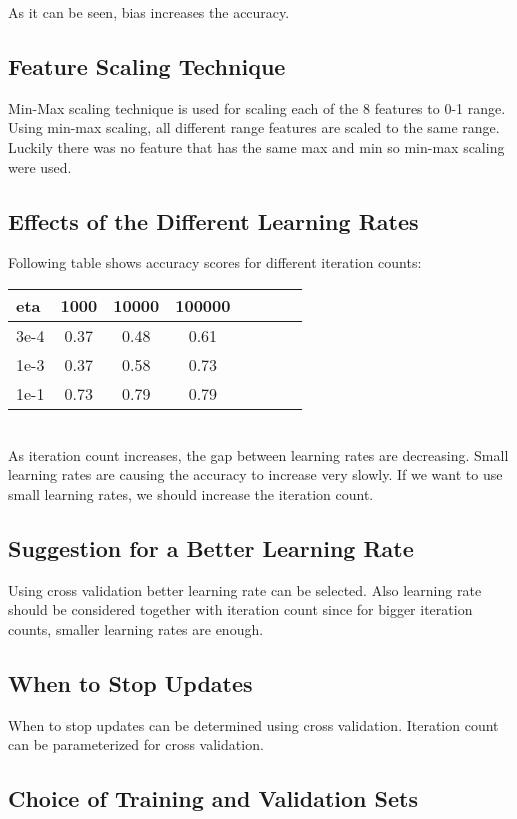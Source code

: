 \documentclass[conference]{IEEEtran}
\begin{document}
As it can be seen, bias increases the accuracy.

\subsection{Feature Scaling Technique}

Min-Max scaling technique is used for scaling each of the 8 features to 0-1 range. Using min-max scaling, all different range features are scaled to the same range. Luckily there was no feature that has the same max and min so min-max scaling were used.

\subsection{Effects of the Different Learning Rates}

Following table shows accuracy scores for different iteration counts: \\

\begin{tabular}{l*{6}{c}r}
eta  & 1000 & 10000 & 100000 \\
\hline
3e-4 & 0.37 & 0.48 & 0.61 \\
1e-3 & 0.37 & 0.58 & 0.73 \\
1e-1 & 0.73 & 0.79 & 0.79 \\
\end{tabular} \\

As iteration count increases, the gap between learning rates are decreasing. Small learning rates are causing the accuracy to increase very slowly. If we want to use small learning rates, we should increase the iteration count.

\subsection{Suggestion for a Better Learning Rate}

Using cross validation better learning rate can be selected. Also learning rate should be considered together with iteration count since for bigger iteration counts, smaller learning rates are enough.

\subsection{When to Stop Updates}

When to stop updates can be determined using cross validation. Iteration count can be parameterized for cross validation.

\subsection{Choice of Training and Validation Sets}
\end{document}
